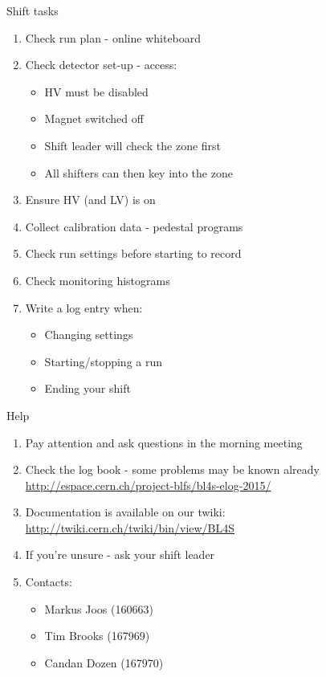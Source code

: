 \documentclass[9pt]{beamer}
\begin{document}
\begin{frame}{Shift tasks}
\begin{enumerate}
\item Check run plan - online whiteboard
\item Check detector set-up - access:
    \begin{itemize}
        \item HV must be disabled
        \item Magnet switched off
        \item Shift leader will check the zone first
        \item All shifters can then key into the zone
    \end{itemize}
    \item Ensure HV (and LV) is on
    \item Collect calibration data - pedestal programs
    \item Check run settings before starting to record
    \item Check monitoring histograms
    \item Write a log entry when:
    \begin{itemize}
      \item Changing settings
      \item Starting/stopping a run
      \item Ending your shift
    \end{itemize}
\end{enumerate}
\end{frame}

\begin{frame}{Help}
  \begin{enumerate}
    \item Pay attention and ask questions in the morning meeting
    \item Check the log book - some problems may be known already \url{http://espace.cern.ch/project-blfs/bl4s-elog-2015/}
    \item Documentation is available on our twiki: \url{http://twiki.cern.ch/twiki/bin/view/BL4S}
    \item If you're unsure - ask your shift leader
    \item Contacts:
    \begin{itemize}
      \item Markus Joos (160663)
      \item Tim Brooks (167969)
      \item Candan Dozen (167970)
    \end{itemize}
  \end{enumerate}
\end{frame}
\end{document}
